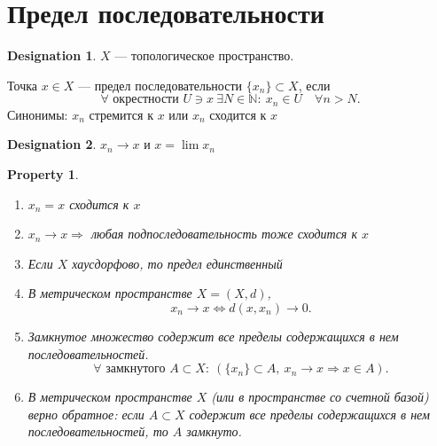 \documentclass[11pt]{book}
\newcommand{\N}{\mathbb{N}}
\theoremstyle{definition}
\theoremstyle{plain}
\theoremstyle{plain}
\newtheorem*{prop}{Property}
\theoremstyle{definition}
\newtheorem*{name}{Designation}
\theoremstyle{remark}
\begin{document}
\section{Предел последовательности}
\begin{name}
    $ X$ ---  топологическое пространство.
\end{name}
\begin{defn}
    Точка $ x \in  X$ --- предел последовательности $ \{x_n\} \subset X$, если$$ \forall \text{ окрестности } U \ni x ~ \exists N \in \N: ~ x_n \in  U \quad \forall n > N.$$
    Синонимы:
    $ x_n$ стремится к  $ x$ или  $ x_{n}$ сходится к $ x$
    \begin{name}
	$ x_{n} \to  x$ и $ x = \lim x_{n} $
    \end{name}
\end{defn}
\begin{prop}
    $ $
    \begin{enumerate}[noitemsep]
	\item $ x_{n} = x$ сходится к $ x$
	\item $ x_{n} \to  x \Longrightarrow $ любая подпоследовательность тоже сходится к $ x$
	\item Если  $ X$ хаусдорфово, то предел единственный
	\item  В метрическом пространстве $ X = (X, d)$,
	    \[
		x_{n} \to  x \Longleftrightarrow d(x, x_n) \to  0
	    .\]
	\item Замкнутое множество содержит все пределы содержащихся в нем последовательностей.
	    \[
		\forall  \text{ замкнутого } A \subset X: ~ (\{x_{n}\} \subset A, ~ x_{n} \to  x \Longrightarrow x \in  A)
	    .\]
	\item В метрическом пространстве $ X$ (или в пространстве со счетной базой) верно обратное:
	    если $ A \subset X$ содержит все пределы содержащихся в нем последовательностей, то $ A$ замкнуто.
    \end{enumerate}
\end{prop}
\end{document}
